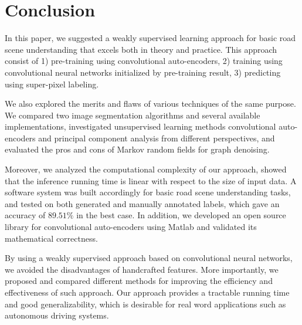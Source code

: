
\chapter{Conclusion}
\label{cha:conclusion}
In this paper, we suggested a weakly supervised learning approach for basic road scene understanding that excels both in theory and practice. This approach consist of 1) pre-training using convolutional auto-encoders, 2) training using convolutional neural networks initialized by pre-training result, 3) predicting using super-pixel labeling.

We also explored the merits and flaws of various techniques of the same purpose. We compared two image segmentation algorithms and several available implementations, investigated unsupervised learning methods convolutional auto-encoders and principal component analysis from different perspectives, and evaluated the pros and cons of Markov random fields for graph denoising.

Moreover, we analyzed the computational complexity of our approach, showed that the inference running time is linear with respect to the size of input data. A software system was built accordingly for basic road scene understanding tasks, and tested on both generated and manually annotated labels, which gave an accuracy of $89.51\%$ in the best case. In addition, we developed an open source library for convolutional auto-encoders using Matlab and validated its mathematical correctness.

By using a weakly supervised approach based on convolutional neural networks, we avoided the disadvantages of handcrafted features. More importantly, we proposed and compared different methods for improving the efficiency and effectiveness of such approach. Our approach provides a tractable running time and good generalizability, which is desirable for real word applications such as autonomous driving systems.
